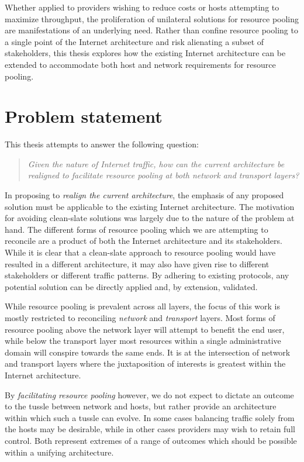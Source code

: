 Whether applied to providers wishing to reduce costs or hosts attempting to maximize throughput, the proliferation of unilateral solutions for resource pooling are manifestations of an underlying need. 
Rather than confine resource pooling to a single point of the Internet architecture and risk alienating a subset of stakeholders, this thesis explores how the existing Internet architecture can be extended to accommodate both host and network requirements for resource pooling.

\section{Problem statement}
\label{sec:introduction:objectives}

This thesis attempts to answer the following question:

\begin{quote}
\textit{
Given the nature of Internet traffic, how can the current architecture be realigned to facilitate resource pooling at both network and transport layers?
}
\end{quote}

In proposing to \emph{realign the current architecture}, the emphasis of any proposed solution must be applicable to the existing Internet architecture.
The motivation for avoiding clean-slate solutions was largely due to the nature of the problem at hand.
The different forms of resource pooling which we are attempting to reconcile are a product of both the Internet architecture and its stakeholders.
While it is clear that a clean-slate approach to resource pooling would have resulted in a different architecture, it may also have given rise to different stakeholders or different traffic patterns.
By adhering to existing protocols, any potential solution can be directly applied and, by extension, validated. 

While resource pooling is prevalent across all layers, the focus of this work is mostly restricted to reconciling \emph{network} and \emph{transport} layers. 
Most forms of resource pooling above the network layer will attempt to benefit the end user, while below the transport layer most resources within a single administrative domain will conspire towards the same ends.
It is at the intersection of network and transport layers where the juxtaposition of interests is greatest within the Internet architecture.

By \emph{facilitating resource pooling} however, we do not expect to dictate an outcome to the tussle between network and hosts, but rather provide an architecture within which such a tussle can evolve.
In some cases balancing traffic solely from the hosts may be desirable, while in other cases providers may wish to retain full control.
Both represent extremes of a range of outcomes which should be possible within a unifying architecture.

